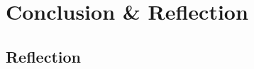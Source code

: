 \documentclass[12pt]{report}
\begin{document}
	

	

	

\newpage


	

	

\newpage

	

	

\newpage

	

	

	

\newpage

	


	

	

	

	

	

	


	


	

	

\part{Conclusion \& Reflection}

\chapter{Reflection}
\end{document}
